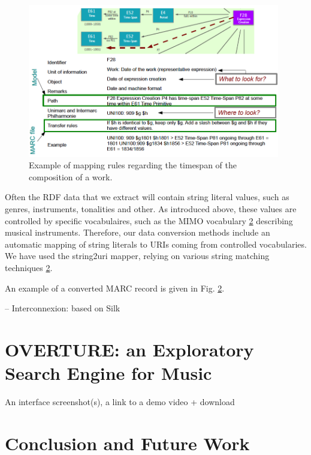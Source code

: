 \documentclass[runningheads,a4paper]{llncs}
\begin{document}
\begin{figure}
  \centering
  \includegraphics[width=11cm]{img/mapping-rules.png}
  \caption{Example of mapping rules regarding the timespan of the composition of a work.}
  \label{fig:mappings}
\end{figure}

Often the RDF data that we extract will contain string literal values, such as genres, instruments, tonalities and other. As introduced above, these values are controlled by specific vocabulaires, such as the MIMO vocabulary \ref{} describing musical instruments. Therefore, our data conversion methods include an automatic mapping of string literals to URIs coming from controlled vocabularies. We have used the string2uri mapper, relying on various string matching techniques \ref{}.

An example of a converted MARC record is given in Fig. \ref{}.  

-- Interconnexion: based on Silk


\section{OVERTURE: an Exploratory Search Engine for Music}

An interface screenshot(s), a link to a demo video + download


\section{Conclusion and Future Work}
\end{document}
